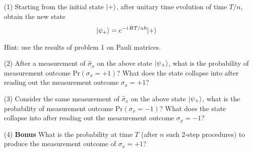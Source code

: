 (1) Starting from the initial state $|{+}\rangle$, after unitary time evolution of time $T/n$, obtain the new state
\begin{align}
    |{\psi_+}\rangle=e^{-\hspace{1pt}\mathrm{i}\hspace{1pt}\hat HT/n\hbar}|{+}\rangle
\end{align}

Hint: use the results of problem 1 on Pauli matrices. 

(2) After a measurement of $\hat\sigma_x$ on the above state $|{\psi_+}\rangle$, what is the probability of measurement outcome $\text{Pr}(\sigma_x=+1)$? What does the state collapse into after reading out the measurement outcome $\sigma_x=+1$?

(3) Consider the same measurement of $\hat\sigma_x$ on the above state $|{\psi_+}\rangle$, what is the probability of measurement outcome $\text{Pr}(\sigma_x=-1)$? What does the state collapse into after reading out the measurement outcome $\sigma_x=-1$?

(4) \textbf{Bonus} What is the probability at time $T$ (after $n$ such 2-step procedures) to produce the measurement outcome of $\sigma_x=+1$?